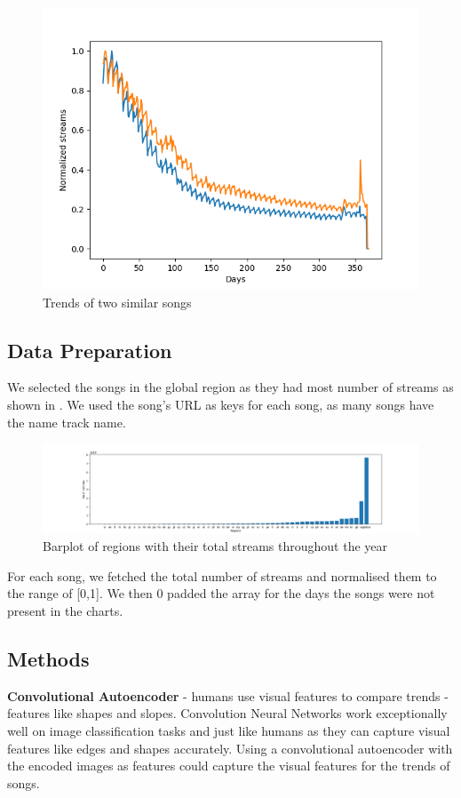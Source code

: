 \begin{appendix}
\begin{figure}[h]
\centering
\centerline{\includegraphics[scale=0.6]{Outputs/cluster example 1.png}}
\caption{Trends of two similar songs}
\label{fig:trendstwosongs}
\end{figure}

\subsection{Data Preparation}
We selected the songs in the global region as they had most number of streams as shown in \label{fig:streamsper}. We used the song's URL as keys for each song, as many songs have the name track name.

\begin{figure}[h]
\centering
\centerline{\includegraphics[width=\textwidth]{Outputs/streams per region.png}}
\caption{Barplot of regions with their total streams throughout the year}
\label{fig:streamsper}
\end{figure}

For each song, we fetched the total number of streams and normalised them to the range of [0,1]. We then 0 padded the array for the days the songs were not present in the charts.

\subsection{Methods}
\textbf{Convolutional Autoencoder} - humans use visual features to compare trends - features like shapes and slopes. Convolution Neural Networks work exceptionally well on image classification tasks and just like humans as they can capture visual features like edges and shapes accurately. Using a convolutional autoencoder with the encoded images as features could capture the visual features for the trends of songs.


\end{appendix}
